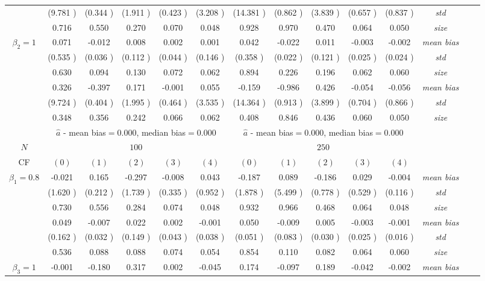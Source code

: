 \begin{table}
\begin{threeparttable}
{\begin{tabular}{|c|c|c|c|c|c|c|c|c|c|c|c|c|c|}
&(9.781 )&(0.344 )&(1.911 )&(0.423 )&(3.208 )&(14.381 )&(0.862 )&(3.839 )&(0.657 )&(0.837 )&\textit{std}\\ 
& 0.716 & 0.550 &0.270 &0.070 &0.048 &0.928& 0.970 &0.470 &0.064& 0.050 &\textit{size} \\ \midrule 
\multirow{4}{*}{$\beta_2=1$}& 0.071 & -0.012 &0.008 &0.002 &0.001 &0.042& -0.022 &0.011 &-0.003& -0.002 &\textit{mean bias} \\ 
&(0.535 )&(0.036 )&(0.112 )&(0.044 )&(0.146 )&(0.358 )&(0.022 )&(0.121 )&(0.025 )&(0.024 )&\textit{std}\\ 
& 0.630 & 0.094 &0.130 &0.072 &0.062 &0.894& 0.226 &0.196& 0.062 &0.060 &\textit{size} \\\midrule 
\multirow{4}{*}{$\beta_3=1$}& 0.326 & -0.397 &0.171& -0.001 &0.055 &-0.159 &-0.986 &0.426 &-0.054& -0.056 &\textit{mean bias} \\ 
&(9.724 )&(0.404 )&(1.995 )&(0.464 )&(3.535 )&(14.364 )&(0.913 )&(3.899 )&(0.704 )&(0.866 )&\textit{std}\\ 
& 0.348 & 0.356 &0.242 &0.066 &0.062 &0.408& 0.846& 0.436 &0.060 &0.050 &\textit{size} \\\midrule 
&\multicolumn{5}{|c|}{$\hat{a}$ - mean bias$=$0.000, median bias$=$0.000 }&\multicolumn{5}{|c|}{$\hat{a}$ - mean bias$=$0.000, median bias$=$0.000 }&\\ \hline 
\cellcolor{yellow}$N$&\multicolumn{5}{|c|}{\cellcolor{yellow}$100$}&\multicolumn{5}{|c|}{\cellcolor{yellow}$250$}&\\\hline 
CF&$(0)$&$(1)$&$(2)$&$(3)$&$(4)$& $(0)$ &$(1)$&$(2)$&$(3)$&$(4)$&\\\hline 
\multirow{4}{*}{$\beta_1=0.8$}& -0.021 & 0.165 &-0.297 &-0.008 &0.043 &-0.187& 0.089 &-0.186 &0.029& -0.004 &\textit{mean bias} \\ 
&(1.620 )&(0.212 )&(1.739 )&(0.335 )&(0.952 )&(1.878 )&(5.499 )&(0.778 )&(0.529 )&(0.116 )&\textit{std}\\ 
& 0.730 & 0.556 &0.284 &0.074 &0.048 &0.932& 0.966 &0.468 &0.064& 0.048 &\textit{size} \\\midrule 
\multirow{4}{*}{$\beta_2=1$}& 0.049 & -0.007 &0.022 &0.002 &-0.001 &0.050& -0.009 &0.005 &-0.003& -0.001 &\textit{mean bias} \\ 
&(0.162 )&(0.032 )&(0.149 )&(0.043 )&(0.038 )&(0.051 )&(0.083 )&(0.030 )&(0.025 )&(0.016 )&\textit{std}\\ 
& 0.536 & 0.088 &0.088 &0.074 &0.054 &0.854& 0.110 &0.082& 0.064 &0.060 &\textit{size} \\ \midrule
\multirow{4}{*}{$\beta_3=1$}& -0.001 & -0.180 &0.317& 0.002 &-0.045 &0.174 &-0.097 &0.189 &-0.042& -0.002 &\textit{mean bias} \\ 

\end{tabular}}
\end{threeparttable}
\end{table}

